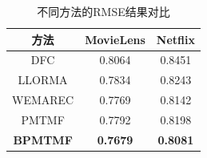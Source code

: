 \begin{table}
	\centering
	\caption{不同方法的RMSE结果对比}

		\begin{tabular}{|c||c|c|}
			\hline
			方法     & MovieLens & Netflix \bigstrut\\
			\hline
			\hline
			DFC   & 0.8064 & 0.8451 \bigstrut\\
			\hline
			LLORMA & 0.7834 & 0.8243 \bigstrut\\
			\hline
			WEMAREC & 0.7769 & 0.8142 \bigstrut\\
			\hline
			\hline
			PMTMF & 0.7792 & 0.8198 \bigstrut\\
			\hline
			\textbf{BPMTMF} & \textbf{0.7679} & \textbf{0.8081} \bigstrut\\
			\hline
		\end{tabular}%

	\label{tab-bpmtmf-rmse}%
\end{table}%

